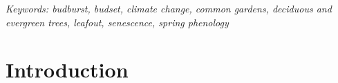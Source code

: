 \documentclass[12pt]{article}
\begin{document}

\noindent \emph{Keywords: budburst, budset, climate change, common gardens, deciduous and evergreen trees, leafout, senescence, spring phenology}\\ %


\section{Introduction}

\end{document}

